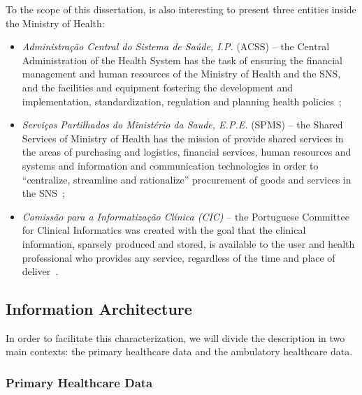 To the scope of this dissertation, is also interesting to present three entities inside the Ministry of Health:
\begin{itemize}
\item \textit{Administração Central do Sistema de Saúde, I.P.} (ACSS) -- the Central Administration of the Health System has the task of ensuring the financial management and human resources of the Ministry of Health and the SNS, and the facilities and equipment fostering the development and implementation, standardization, regulation and planning health policies~\citep{SAUDE2011};
\item \textit{Serviços Partilhados do Ministério da Saude, E.P.E.} (SPMS) -- the Shared Services of Ministry of Health has the mission of provide shared services in the areas of purchasing and logistics, financial services, human resources and systems and information and communication technologies in order to ``centralize, streamline and rationalize'' procurement of goods and services in the SNS~\citep{Saude2010a};
\item \textit{Comissão para a Informatização Clínica (CIC)} -- the Portuguese Committee for Clinical Informatics was created with the goal that the clinical information, sparsely produced and stored, is available to the user and health professional who provides any service, regardless of the time and place of deliver~\citep{Saude2011a}.
\end{itemize}







\subsection{Information Architecture}

In order to facilitate this characterization, we will divide the description in two main contexts: the primary healthcare data and the ambulatory healthcare data.

\subsubsection{Primary Healthcare Data}

